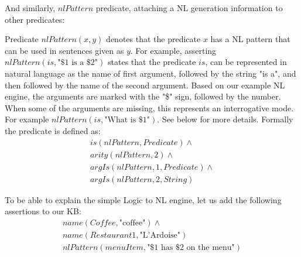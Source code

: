 And similarly, $nlPattern$ predicate, attaching a NL generation information to 
other predicates:

\begin{definition}\label{def:predNlPattern}
Predicate $nlPattern(x,y)$ denotes that the predicate $x$ has a NL pattern
that can be used in sentences given as $y$. For example, asserting 
$nlPattern(is,\text{"\$1 is a \$2"})$ states that the predicate $is$, can
be represented in natural language as the name of first argument, followed by
the string "is a", and then followed by the name of the second argument. Based
on our example NL engine, the arguments are marked with the "\$" sign, followed
by the number. When some of the arguments are missing, this represents an 
interrogative mode. For example $nlPattern(is,\text{"What is \$1"})$. See below
for more details. Formally the predicate is defined as:
\begin{equation}\label{as:predNL}
\begin{gathered}
	is(nlPattern,Predicate)\land\\
	arity(nlPattern,2)\land\\
	argIs(nlPattern,1,Predicate)\land\\
	argIs(nlPattern,2,String)
\end{gathered}
\end{equation}
\end{definition}

To be able to explain the simple Logic to NL engine, let us add the following 
assertions to our KB:
\begin{equation}\label{as:menuitem1}
\begin{gathered}
	name(Coffee,\text{"coffee"})\land\\
	name(Restaurant1, \text{"L'Ardoise"})\\
	nlPattern(menuItem, \text{"\$1 has \$2 on the menu"})
\end{gathered}
\end{equation}

